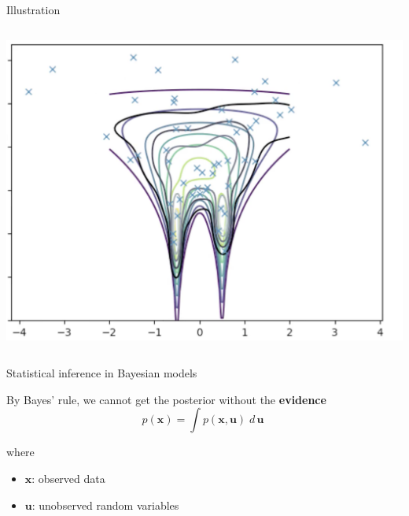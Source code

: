 \documentclass[10pt]{beamer}
\numberwithin{equation}{section}
\theoremstyle{definition}
\newcommand{\ds}{\displaystyle}
\newcommand{\+}[1]{\ensuremath{{\boldsymbol #1}}} %
\newcommand{\wrt}[1]{\; d \,{#1} \;}
\begin{document}
\begin{frame}{Illustration}
\begin{minipage}[t][.9\textheight]{\textwidth}
\begin{columns}[t]
\includegraphics[width=.7\textwidth]{images/intro_animation_4.png}
\end{columns}

\vfill

  \end{minipage}
  
\end{frame}


\begin{frame}{Statistical inference in Bayesian models}


\begin{block}{}

By Bayes' rule, we cannot get the posterior without the \textbf{evidence}
\begin{equation}
p(\+x) =  \ds\int p(\+x,\+u) \wrt{\+u}
\end{equation}

where 
\begin{itemize}
\item $\+x$: observed data 
\item $\+u$: unobserved random variables
\end{itemize}

\end{block}

\end{frame}
\end{document}
